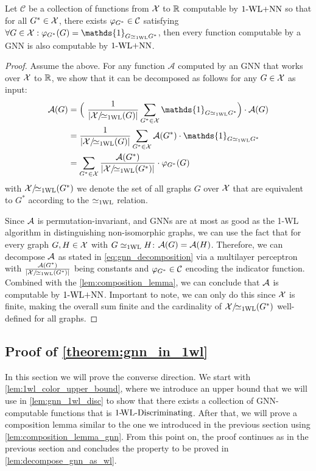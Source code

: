 \begin{lemma}\label{lem:decompose_gnn_as_wl}
    Let $\mathcal{C}$ be a collection of functions from $\mathcal{X}$ to $\mathbb{R}$ computable by $\text{1-WL+NN}$ so that for all $G^* \in \mathcal{X}$, there exists 
    $\varphi_{G^*} \in \mathcal{C}$ satisfying $\forall G \in \cX: \varphi_{G^*}(G) = \mathds{1}_{G \wliso G^*}$, then every function computable by a GNN is also computable by $\text{1-WL+NN}$.
\end{lemma}

\begin{proof}
    Assume the above. For any function $\mathcal{A}$ computed by an GNN that works over $\mathcal{X}$ to $\mathbb{R}$, we show that it can be decomposed as follows for any $G \in \mathcal{X}$ as input:
    \begin{align}\label{eq:gnn_decomposition}
        \mathcal{A}(G) &= \Bigl( \ \frac{1}{|\cX/\!{\wliso}(G)|}\sum_{G^* \in \cX} \mathds{1}_{G \wliso G^*} \Bigr) \cdot \mathcal{A}(G) \nonumber \\
        &= \frac{1}{|\cX/\!{\wliso}(G)|}\sum_{G^* \in \cX} \mathcal{A}(G^*) \cdot \mathds{1}_{G \wliso G^*} \nonumber \\
        &= \sum_{G^* \in \cX} \frac{\mathcal{A}(G^*)}{|\cX/\!{\wliso}(G^*)|}  \cdot \varphi_{G^*}(G)
    \end{align}
    with $\mathcal{X}/\!{\simeq_{\text{1WL}}}(G^*)$ we denote the set of all graphs $G$ over $\mathcal{X}$ that are equivalent to $G^*$ according to the $\simeq_{\text{1WL}}$ relation.

    Since $\mathcal{A}$ is permutation-invariant, and GNNs are at most as good as the 1-WL algorithm in distinguishing non-isomorphic graphs, we can use the fact that for every graph $G,H \in \mathcal{X}$ with $G \simeq_{\text{1WL}} H$: $\mathcal{A}(G) = \mathcal{A}(H)$. Therefore, we can decompose $\mathcal{A}$ as stated in \autoref{eq:gnn_decomposition} via a multilayer perceptron with $\frac{\mathcal{A}(G^*)}{|\mathcal{X}/\!{\simeq_{\text{1WL}}}(G^*)|}$ being constants and $\varphi_{G^*} \in \mathcal{C}$ encoding the indicator function. Combined with the \autoref{lem:composition_lemma}, we can conclude that $\mathcal{A}$ is computable by $\text{1-WL+NN}$. Important to note, we can only do this since $\mathcal{X}$ is finite, making the overall sum finite and the cardinality of $\mathcal{X}/\!{\simeq_{\text{1WL}}}(G^*)$ well-defined for all graphs.
\end{proof}

\subsection{Proof of \autoref{theorem:gnn_in_1wl}}
In this section we will prove the converse direction. We start with \cref{lem:1wl_color_upper_bound}, where we introduce an upper bound that we will use in \cref{lem:gnn_1wl_disc} to show that there exists a collection of GNN-computable functions that is $\text{1-\!WL-Discriminating}$. After that, we will prove a composition lemma similar to the one we introduced in the previous section using \cref{lem:composition_lemma_gnn}. From this point on, the proof continues as in the previous section and concludes the property to be proved in \cref{lem:decompose_gnn_as_wl}.

